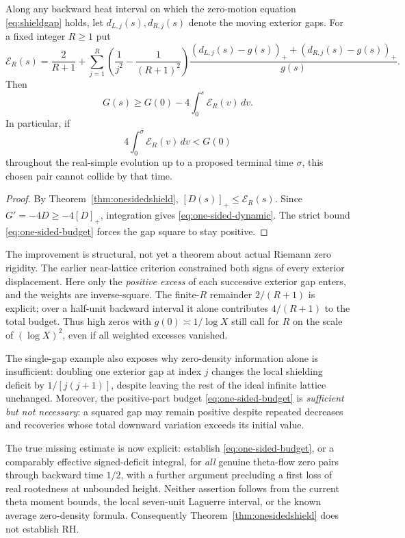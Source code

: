 \begin{corollary}\label{cor:onesidedheat}
Along any backward heat interval on which the
zero-motion equation \eqref{eq:shieldgap} holds,
let $d_{L,j}(s),d_{R,j}(s)$ denote the moving
exterior gaps. For a fixed integer $R\ge1$ put
\[
\mathcal E_R(s)=\frac2{R+1}
+\sum_{j=1}^R
\left(\frac1{j^2}-\frac1{(R+1)^2}\right)
\frac{
(d_{L,j}(s)-g(s))_+
+(d_{R,j}(s)-g(s))_+}{g(s)}.
\]
Then
\begin{equation}\label{eq:one-sided-dynamic}
G(s)\ge G(0)-4\int_0^s\mathcal E_R(v)\,dv.
\end{equation}
In particular, if
\begin{equation}\label{eq:one-sided-budget}
\boxed{
4\int_0^\sigma\mathcal E_R(v)\,dv
<G(0)
}
\end{equation}
throughout the real-simple evolution up to
a proposed terminal time $\sigma$,
this chosen pair cannot collide by that time.
\end{corollary}
\begin{proof}
By Theorem~\ref{thm:onesidedshield},
$[D(s)]_+\le\mathcal E_R(s)$.
Since $G'=-4D\ge-4[D]_+$,
integration gives \eqref{eq:one-sided-dynamic}.
The strict bound \eqref{eq:one-sided-budget}
forces the gap square to stay positive.
\end{proof}

The improvement is structural, not yet a theorem
about actual Riemann zero rigidity. The earlier
near-lattice criterion constrained both signs of
every exterior displacement. Here only the
\emph{positive excess} of each successive exterior
gap enters, and the weights are inverse-square.
The finite-$R$ remainder $2/(R+1)$ is explicit;
over a half-unit backward interval it alone
contributes $4/(R+1)$ to the total budget.
Thus high zeros with $g(0)\asymp1/\log X$
still call for $R$ on the scale of $(\log X)^2$,
even if all weighted excesses vanished.

The single-gap example also exposes why
zero-density information alone is insufficient:
doubling one exterior gap at index $j$
changes the local shielding deficit by
$1/[j(j+1)]$, despite leaving the rest of
the ideal infinite lattice unchanged.
Moreover, the positive-part budget
\eqref{eq:one-sided-budget} is
\emph{sufficient but not necessary}:
a squared gap may remain positive despite
repeated decreases and recoveries whose total
downward variation exceeds its initial value.

The true missing estimate is now explicit:
establish \eqref{eq:one-sided-budget}, or a
comparably effective signed-deficit integral,
for \emph{all} genuine theta-flow zero pairs
through backward time $1/2$, with a further
argument precluding a first loss of real
rootedness at unbounded height. Neither
assertion follows from the current theta
moment bounds, the local seven-unit
Laguerre interval, or the known average
zero-density formula. Consequently
Theorem~\ref{thm:onesidedshield}
does not establish RH.

